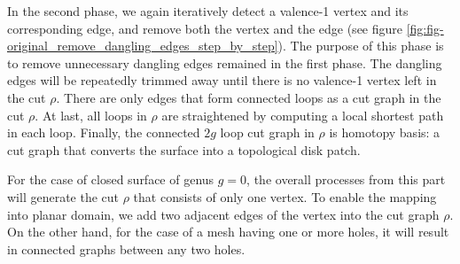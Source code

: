 \documentclass[a4paper,twoside]{article}
\begin{document}
In the second phase, we again iteratively detect a valence-1 vertex and its corresponding edge, and remove both the vertex and the edge (see figure \ref{fig:fig-original_remove_dangling_edges_step_by_step}). The purpose of this phase is to remove unnecessary dangling edges remained in the first phase. The dangling edges will be repeatedly trimmed away until there is no valence-1 vertex left in the cut $\rho$. There are only edges that form connected loops as a cut graph in the cut $\rho$. At last, all loops in $\rho$ are straightened by computing a local shortest path in each loop. Finally, the connected $2g$ loop cut graph in $\rho$ is homotopy basis: a cut graph that converts the surface into a topological disk patch. %

For the case of closed surface of genus $g=0$, the overall processes from this part will generate the cut $\rho$ that consists of only one vertex. To enable the mapping into planar domain, we add two adjacent edges of the vertex into the cut graph $\rho$. On the other hand, for the case of a mesh having one or more holes, it will result in connected graphs between any two holes.
\end{document}
